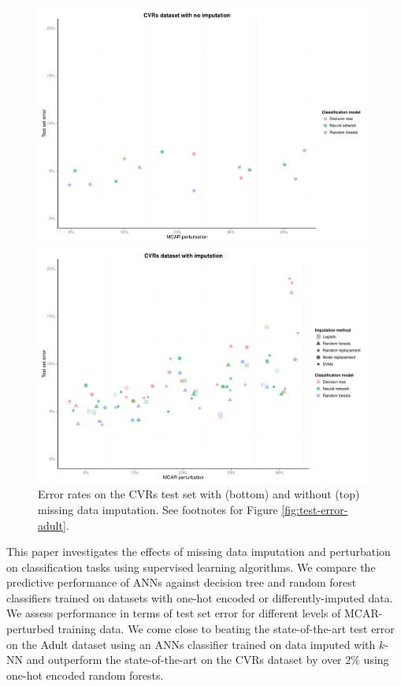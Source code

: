 \documentclass[10pt]{book}
\theoremstyle{definition}
\begin{document}
\begin{figure}[h!]
\includegraphics[scale=0.6, center]{figure/test-errors-votes-no-imp-mcar}\par
\includegraphics[scale=0.6, center]{figure/test-errors-votes-imp-mcar}\par
   \caption{\footnotesize Error rates on the CVRs test set with (bottom) and without (top) missing data imputation. See footnotes for Figure \ref{fig:test-error-adult}.}
   \label{fig:test-error-votes}
\end{figure}

\par

\setcounter{chapter}{4}
\setcounter{equation}{0} %

This paper investigates the effects of missing data imputation and perturbation on classification tasks using supervised learning algorithms. We compare the predictive performance of ANNs against decision tree and random forest classifiers trained on datasets with one-hot encoded or differently-imputed data. We assess performance in terms of test set error for different levels of MCAR-perturbed training data. We come close to beating the state-of-the-art test error on the Adult dataset using an ANNs classifier trained on data imputed with $k$-NN and outperform the state-of-the-art on the CVRs dataset by over 2\% using one-hot encoded random forests. 
\end{document}

